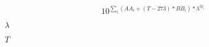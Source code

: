 \documentclass{article}
\begin{document}
\[ 10^{\sum_i{(AA_i + (T-273)*BB_i)*\lambda^{lp_i}}} \]
\pagebreak

$\lambda$
\pagebreak

$T$
\pagebreak
\end{document}

